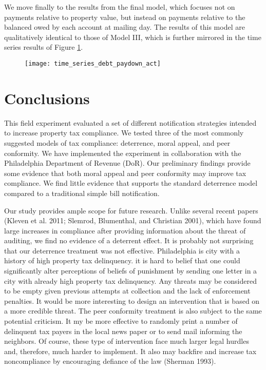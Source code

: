 \documentclass[12pt,titlepage]{article}
\begin{document}
We move finally to the results from the final model, which focuses not
on payments relative to property value, but instead on payments
relative to the balanced owed by each account at mailing day. The
results of this model are qualitatively identical to those of Model
III, which is further mirrored in the time series results of Figure
\ref{fig:drawdown}.

\begin{figure}[htbp]
\begin{center}
\caption{}\label{fig:drawdown}
\texttt{[image: time\_series\_debt\_paydown\_act]}
\par\end{center}
\end{figure}

\newpage

\section{Conclusions}

This field experiment evaluated a set of different notification
strategies intended to increase property tax compliance. We tested three of the most commonly
suggested models of tax compliance: deterrence, moral appeal, and peer conformity.
We have implemented the experiment in collaboration with the Philadelphia Department of Revenue (DoR). 
Our preliminary findings provide some evidence that both moral appeal
and peer conformity may improve tax compliance. We find
little evidence that supports the standard deterrence model compared to a traditional simple bill notification.

Our study provides ample scope for future research.  Unlike several recent papers (Kleven et al. 2011; Slemrod, Blumenthal, and Christian 2001), which have found large increases in compliance after providing information about the threat of auditing, we find no evidence of a deterrent effect. 
It is probably not surprising that our deterrence treatment was not effective. Philadelphia is city with a history of high property tax delinquency. it is hard to belief that one could significantly alter perceptions of beliefs of punishment by sending one letter in a city with already high property tax delinquency. 
Any threats may be considered to be empty given previous attempts at collection and the lack of enforcement penalties. 
It would be more interesting to design an intervention that is based on a more credible threat.
The peer conformity treatment is also subject to the same potential criticism. It my be more effective to randomly print 
a number of delinquent tax payers in the local news paper or to send mail informing the neighbors. Of course, these type of intervention face much larger legal hurdles and, therefore, much harder to implement.  It also may backfire and increase tax noncompliance by encouraging defiance of the law (Sherman 1993).
\end{document}

